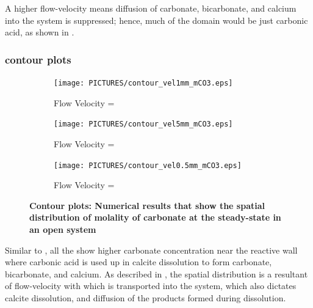 A higher flow-velocity means diffusion of carbonate, bicarbonate, and calcium into the system is suppressed; hence, much of the domain would be 
just carbonic acid, as shown in . 

\subsubsection*{ contour plots} \label{sssec:contourmCO3}

\begin{figure}[!h]
\centering
    \begin{subfigure}{.5\linewidth}
        \centering
        \texttt{[image: PICTURES/contour\_vel1mm\_mCO3.eps]}
        \caption{\small Flow Velocity = }
        \label{fig:CO3Steady-state}       %
    \end{subfigure}%
    \hfill
    \begin{subfigure}{.5\linewidth}
        \centering
        \texttt{[image: PICTURES/contour\_vel5mm\_mCO3.eps]}
        \caption{\small Flow Velocity = }
        \label{fig:CO3Steady-state5mm}       %
    \end{subfigure}%
    \hfill
    \begin{subfigure}{.5\linewidth}
        \centering
        \texttt{[image: PICTURES/contour\_vel0.5mm\_mCO3.eps]}
        \caption{\small Flow Velocity = }
        \label{fig:CO3Steady-state0.5mm}       %
    \end{subfigure}%
    \caption [\DuMuX Contour plots: Numerical results that show the spatial distribution of molality of carbonate at the steady-state in an open system] {\textbf{\DuMuX Contour plots: Numerical results that show the spatial distribution of molality of carbonate at the steady-state in an open system}}
     \label{fig:contourCO3}
\end{figure}

Similar to , all the  show higher 
carbonate concentration near the reactive wall where carbonic acid is used up in calcite dissolution to form carbonate, bicarbonate, and calcium. 
As described in , the spatial distribution is a resultant of flow-velocity with which  is transported into the system, which 
also dictates calcite dissolution, and diffusion of the products formed during dissolution. 

